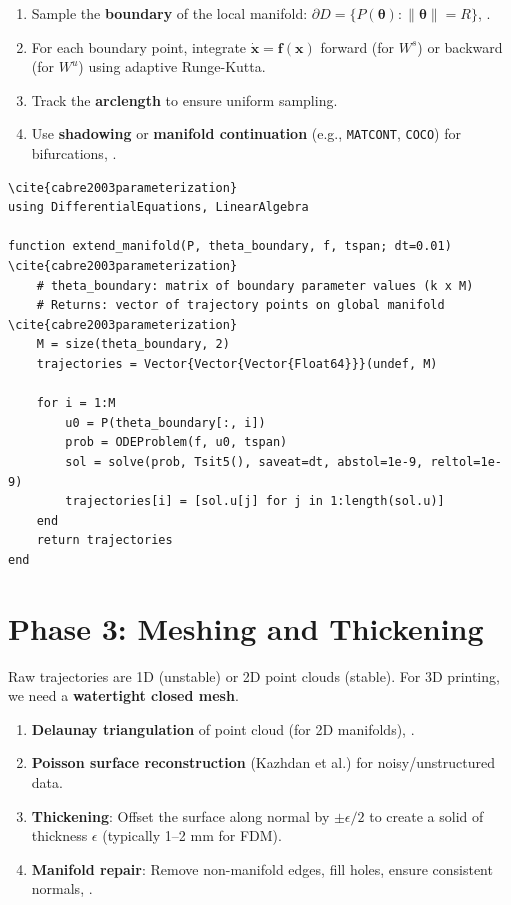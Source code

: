\begin{enumerate}
    \item Sample the \textbf{boundary} of the local manifold: $\partial D = \{P(\bm{\theta}) : \|\bm{\theta}\| = R\}$, \cite{cabre2003parameterization}.
    \item For each boundary point, integrate $\dot{\bm{x}} = \bm{f}(\bm{x})$ forward (for $W^s$) or backward (for $W^u$) using adaptive Runge-Kutta.
    \item Track the \textbf{arclength} to ensure uniform sampling.
    \item Use \textbf{shadowing} or \textbf{manifold continuation} (e.g., \texttt{MATCONT}, \texttt{COCO}) for bifurcations, \cite{cabre2003parameterization}.
\end{enumerate}

\begin{lstlisting}[style=julia,caption=Global manifold extension] \cite{cabre2003parameterization}
using DifferentialEquations, LinearAlgebra

function extend_manifold(P, theta_boundary, f, tspan; dt=0.01) \cite{cabre2003parameterization}
    # theta_boundary: matrix of boundary parameter values (k x M)
    # Returns: vector of trajectory points on global manifold \cite{cabre2003parameterization}
    M = size(theta_boundary, 2)
    trajectories = Vector{Vector{Vector{Float64}}}(undef, M)
    
    for i = 1:M
        u0 = P(theta_boundary[:, i])
        prob = ODEProblem(f, u0, tspan)
        sol = solve(prob, Tsit5(), saveat=dt, abstol=1e-9, reltol=1e-9)
        trajectories[i] = [sol.u[j] for j in 1:length(sol.u)]
    end
    return trajectories
end
\end{lstlisting}

\section{Phase 3: Meshing and Thickening}
\label{sec:3dp:mesh}

Raw trajectories are 1D (unstable) or 2D point clouds (stable). For 3D printing, we need a \textbf{watertight closed mesh}.

\begin{enumerate}
    \item \textbf{Delaunay triangulation} of point cloud (for 2D manifolds), \cite{cabre2003parameterization}.
    \item \textbf{Poisson surface reconstruction} (Kazhdan et al.) for noisy/unstructured data.
    \item \textbf{Thickening}: Offset the surface along normal by $\pm \epsilon/2$ to create a solid of thickness $\epsilon$ (typically 1--2 mm for FDM).
    \item \textbf{Manifold repair}: Remove non-manifold edges, fill holes, ensure consistent normals, \cite{cabre2003parameterization}.
\end{enumerate}

